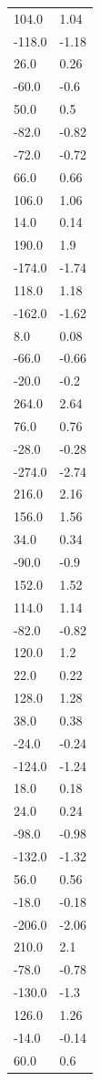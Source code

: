 \begin{longtable}{ll}
104.0 & 1.04 \\
-118.0 & -1.18 \\
26.0 & 0.26 \\
-60.0 & -0.6 \\
50.0 & 0.5 \\
-82.0 & -0.82 \\
-72.0 & -0.72 \\
66.0 & 0.66 \\
106.0 & 1.06 \\
14.0 & 0.14 \\
190.0 & 1.9 \\
-174.0 & -1.74 \\
118.0 & 1.18 \\
-162.0 & -1.62 \\
8.0 & 0.08 \\
-66.0 & -0.66 \\
-20.0 & -0.2 \\
264.0 & 2.64 \\
76.0 & 0.76 \\
-28.0 & -0.28 \\
-274.0 & -2.74 \\
216.0 & 2.16 \\
156.0 & 1.56 \\
34.0 & 0.34 \\
-90.0 & -0.9 \\
152.0 & 1.52 \\
114.0 & 1.14 \\
-82.0 & -0.82 \\
120.0 & 1.2 \\
22.0 & 0.22 \\
128.0 & 1.28 \\
38.0 & 0.38 \\
-24.0 & -0.24 \\
-124.0 & -1.24 \\
18.0 & 0.18 \\
24.0 & 0.24 \\
-98.0 & -0.98 \\
-132.0 & -1.32 \\
56.0 & 0.56 \\
-18.0 & -0.18 \\
-206.0 & -2.06 \\
210.0 & 2.1 \\
-78.0 & -0.78 \\
-130.0 & -1.3 \\
126.0 & 1.26 \\
-14.0 & -0.14 \\
60.0 & 0.6 \\

\end{longtable}
